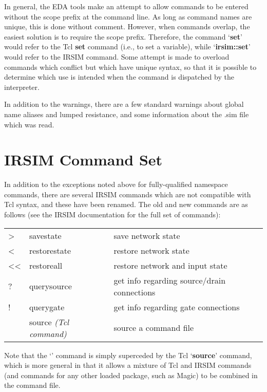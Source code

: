 \documentclass[letterpaper,twoside,12pt]{article}
\begin{document}
In general, the EDA tools make an attempt to allow commands to be entered
without the scope prefix at the command line.  As long as command names
are unique, this is done without comment.  However, when commands overlap,
the easiest solution is to require the scope prefix.  Therefore, the command
`{\bfseries set}' would refer to the Tcl {\bfseries set} command (i.e., to set
a variable), while `{\bfseries irsim::set}' would refer to the IRSIM command.
Some attempt is made to overload commands which conflict but which have
unique syntax, so that it is possible to determine which use is intended
when the command is dispatched by the interpreter.

In addition to the warnings, there are a few standard warnings about
global name aliases and lumped resistance, and some information about the
{\ttfamily .sim} file which was read.

\section{IRSIM Command Set}

In addition to the exceptions noted above for fully-qualified namespace
commands, there are several IRSIM commands which are not compatible with
Tcl syntax, and these have been renamed.  The old and new commands are
as follows (see the IRSIM documentation for the full set of commands):

\begin{center}
\begin{tabular}{|lll|} \hline
   >  & savestate	& save network state \\
   <  & restorestate 	& restore network state \\
   << & restoreall 	& restore network and input state \\
   ?  & querysource	& get info regarding source/drain connections \\
   !  & querygate 	& get info regarding gate connections \\
   \@ & source \itshape{(Tcl command)} & source a command file \\ \hline
\end{tabular}
\end{center}

Note that the `{\bfseries \@}' command is simply superceded by the Tcl
`{\bfseries source}' command, which is more general in that it allows
a mixture of Tcl and IRSIM commands (and commands for any other loaded
package, such as Magic) to be combined in the command file.
\end{document}

